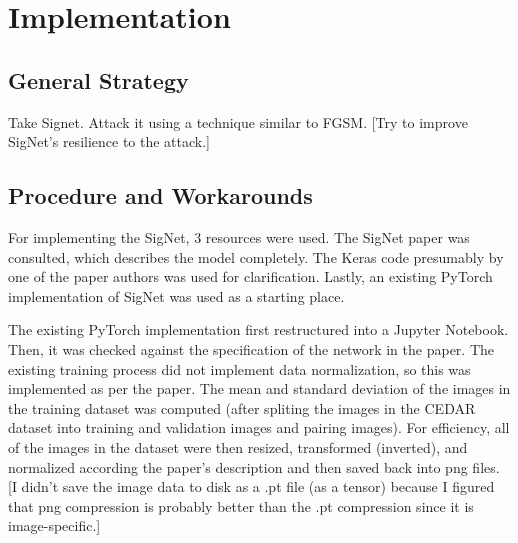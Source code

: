 \section{Implementation}\label{sec:implementation}


\subsection{General Strategy}

Take Signet.
Attack it using a technique similar to FGSM.
[Try to improve SigNet's resilience to the attack.]


\subsection{Procedure and Workarounds}

For implementing the SigNet, 3 resources were used.
The SigNet paper was consulted, which describes the model completely\cite{sig_net}.
The Keras code presumably by one of the paper authors was used for clarification\cite{GitHub_sounakdey}.
Lastly, an existing PyTorch implementation of SigNet was used as a starting place\cite{GitHub_signet_pytorch}.

The existing PyTorch implementation first restructured into a Jupyter Notebook.
Then, it was checked against the specification of the network in the paper.
The existing training process did not implement data normalization, so this was implemented as per the paper.
The mean and standard deviation of the images in the training dataset was computed (after spliting the images in the CEDAR dataset into training and validation images and pairing images).
For efficiency, all of the images in the dataset were then resized, transformed (inverted), and normalized according the paper's description and then saved back into png files.
[I didn't save the image data to disk as a .pt file (as a tensor) because I figured that png compression is probably better than the .pt compression since it is image-specific.]



